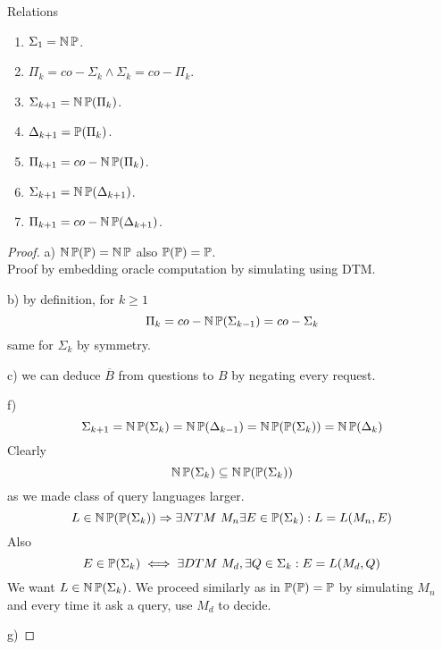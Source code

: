 \begin{properties} Relations
	\begin{enumerate}[label=\alph*)]
		\item $\Sigma_1 = \TNP $.
		\item $\Pi_k = co-\Sigma_k \land \Sigma_k = co-\Pi_k$.
		\item $\Sigma_{k + 1} = \TNP(\Pi_k)$.
		\item $\Delta_{k + 1} = \TP(\Pi_k)$.
		\item $\Pi_{k + 1} = co-\TNP(\Pi_k)$.
		\item $\Sigma_{k + 1} = \TNP(\Delta_{k + 1})$.
		\item $\Pi_{k + 1} = co-\TNP(\Delta_{k + 1})$.
	\end{enumerate}
\end{properties}
\begin{proof}
	a) $\TNP(\TP) = \TNP$ also $\TP(\TP) = \TP$.\\
	Proof by embedding oracle computation by simulating using DTM.

	b) by definition, for $k \geq 1$
	\[ \Pi_k = co-\TNP(\Sigma_{k - 1}) = co-\Sigma_k \]
	same for $\Sigma_k$ by symmetry.

	c) we can deduce $\overline{B}$ from questions to $B$ by negating every request.


	f)
	\[ \Sigma_{k + 1} = \TNP(\Sigma_k) = \TNP(\Delta_{k - 1}) = \TNP(\TP(\Sigma_k)) = \TNP(\Delta_k) \]
	Clearly
	\[ \TNP(\Sigma_k) \subseteq \TNP(\TP(\Sigma_k)) \]
	as we made class of query languages larger.
	\[ L \in \TNP(\TP(\Sigma_k)) \Rightarrow \exists NTM\ M_n \exists E \in \TP(\Sigma_k): L = L(M_n, E) \]
	Also
	\[ E \in \TP(\Sigma_k) \iff \exists DTM\ M_d, \exists Q \in \Sigma_k: E = L(M_d, Q) \]
	We want $L \in \TNP(\Sigma_k)$.
	We proceed similarly as in $\TP(\TP) = \TP$ by simulating $M_n$ and every time it ask a query, use $M_d$ to decide.

	g)

\end{proof}

